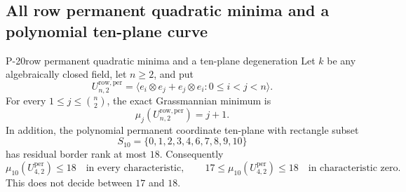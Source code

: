 \subsection{All row permanent quadratic minima and a polynomial ten-plane curve}
\begin{finding}{P-20}{row permanent quadratic minima and a ten-plane degeneration}
Let $k$ be any algebraically closed field, let $n\ge2$, and put
\[
 U^{\mathrm{row,per}}_{n,2}
   =\langle e_i\otimes e_j+e_j\otimes e_i:0\le i<j<n\rangle.
\]
For every $1\le j\le\binom n2$, the exact Grassmannian minimum is
\[
 \mu_j(U^{\mathrm{row,per}}_{n,2})=j+1.
\]
In addition, the polynomial permanent coordinate ten-plane with rectangle subset
\[
 S_{10}=\{0,1,2,3,4,6,7,8,9,10\}
\]
has residual border rank at most $18$.  Consequently
\[
 \mu_{10}(U^{\mathrm{per}}_{4,2})\le18
 \quad\text{in every characteristic},
 \qquad
 17\le\mu_{10}(U^{\mathrm{per}}_{4,2})\le18
 \quad\text{in characteristic zero}.
\]
This does not decide between $17$ and $18$.
\end{finding}
